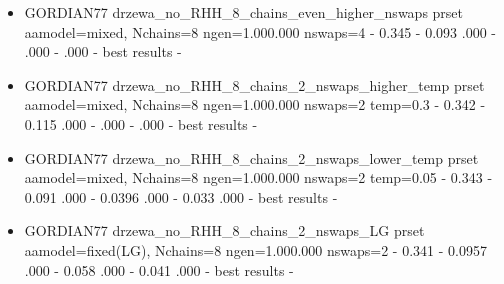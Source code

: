 \begin{itemize}
    \item GORDIAN77 \newline
drzewa\_no\_RHH\_8\_chains\_even\_higher\_nswaps \newline
prset aamodel=mixed, Nchains=8 ngen=1.000.000 nswaps=4  - 0.345  - 0.093 .000 - .000 - .000 - \newline
best results -


    \item GORDIAN77 \newline
drzewa\_no\_RHH\_8\_chains\_2\_nswaps\_higher\_temp \newline
prset aamodel=mixed, Nchains=8 ngen=1.000.000 nswaps=2 temp=0.3  - 0.342  - 0.115 .000 - .000 - .000 - \newline
best results -


    \item GORDIAN77 \newline
drzewa\_no\_RHH\_8\_chains\_2\_nswaps\_lower\_temp \newline
prset aamodel=mixed, Nchains=8 ngen=1.000.000 nswaps=2 temp=0.05  - 0.343  - 0.091 .000 - 0.0396 .000 - 0.033 .000 - \newline
best results -


    \item GORDIAN77 \newline
drzewa\_no\_RHH\_8\_chains\_2\_nswaps\_LG \newline
prset aamodel=fixed(LG), Nchains=8 ngen=1.000.000 nswaps=2  - 0.341  - 0.0957 .000 - 0.058 .000 - 0.041 .000 - \newline
best results -



\end{itemize}
